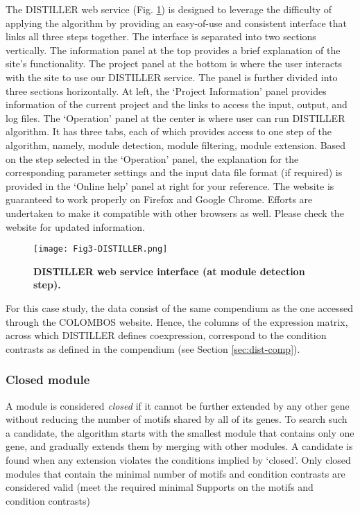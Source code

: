 The DISTILLER web service \cite{DISTILLER} (Fig. \ref{fig:distiller}) is 
designed to leverage the difficulty of applying the algorithm by providing an 
easy-of-use and consistent interface that links all three steps together. 
The interface is separated into two sections vertically. The information panel 
at the top provides a brief explanation of the site's functionality. The 
project panel at the bottom is where the user interacts with the site to use 
our DISTILLER service. 
The panel is further divided into three sections horizontally.  At left, the 
`Project Information' panel provides information of the current project and the 
links to access the input, output, and log files.  
The `Operation' panel at the center is where user can run DISTILLER algorithm.  
It has three tabs, each of which provides access to one step of the
algorithm, namely, module detection, module filtering, module extension.  Based 
on the step selected in the `Operation' panel, the explanation for the 
corresponding parameter settings and the input data file format (if required) 
is provided in the `Online help' panel at right for your reference.
The website is guaranteed to work properly on Firefox and Google Chrome.
Efforts are undertaken to make it compatible with other browsers as well. 
Please check the website for updated information. %

\begin{figure}[tb]
	\centering
  	\texttt{[image: Fig3-DISTILLER.png]}
	\caption[DISTILLER web service interface]{\textbf{DISTILLER web service 
	interface (at module detection step).}}
	\label{fig:distiller}
\end{figure}

For this case study, the data consist of the same compendium as the one 
accessed through the COLOMBOS website. Hence, the columns of the expression 
matrix, across which DISTILLER defines coexpression, correspond to the 
condition contrasts as defined in the compendium (see Section 
\ref{sec:dist-comp}). 


\subsubsection{Closed module}
A module is considered \textit{closed} if it cannot be further extended by any 
other gene without reducing the number of motifs shared by all of its genes. To 
search such a candidate, the algorithm \cite{Lemmens2009} starts with the 
smallest module that contains only one gene, and gradually extends them by 
merging with other modules. A candidate is found when any extension violates 
the conditions implied by `closed'. 
Only closed modules that contain the minimal number of 
motifs and condition contrasts are considered valid (meet the required minimal 
Supports on the motifs and condition contrasts)


